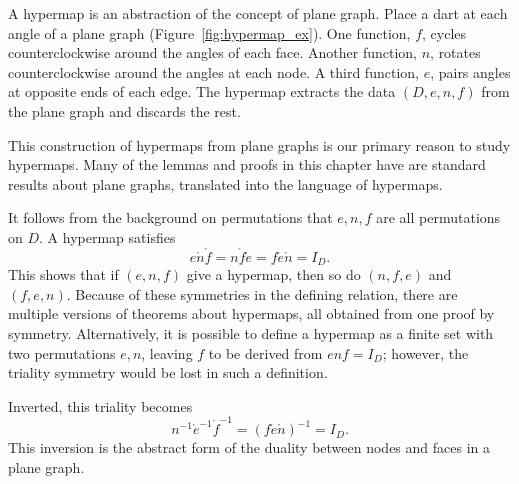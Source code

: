 \begin{remark}\label{rem:hypermap} 
  A hypermap is an abstraction of the concept of plane graph.  Place a
  dart at each angle of a plane graph (Figure~\ref{fig:hypermap_ex}).
  One function, $f$, cycles counterclockwise around the angles of each
  face.  Another function, $n$, rotates counterclockwise around the
  angles at each node.  A third function, $e$, pairs angles at
  opposite ends of each edge.  The hypermap extracts the data
  $(D,e,n,f)$ from the plane graph and discards the rest.

  This construction of hypermaps from plane graphs is our primary
  reason to study hypermaps.  Many of the lemmas and proofs in this
  chapter have are standard results about plane graphs, translated
  into the language of hypermaps.  
%
%
\end{remark}


\figZGPXAWJ %

It follows from the background on permutations that $e,n,f$ are all permutations on $D$.
A hypermap satisfies 
\begin{equation}\label{eqn:triality}
e \ocirc n\ocirc f = n\ocirc f\ocirc e = f\ocirc e\ocirc n = I_D.
\end{equation}
This  shows that if $(e,n,f)$ give a
hypermap, then so do $(n,f,e)$ and $(f,e,n)$.  Because of these
symmetries in the defining relation, there are multiple versions of
theorems about hypermaps, all obtained from one proof by symmetry.
Alternatively, it is possible to define a hypermap as a finite set
with two permutations $e,n$, leaving $f$ to be derived from $e n f =
I_D$; however, the triality symmetry would be lost in such a
definition.

Inverted, this triality becomes
\[ 
n^{-1} \ocirc e^{-1} \ocirc f^{-1} = (f \ocirc e \ocirc n)^{-1} = I_D.
\] 
This inversion is the abstract form of the duality between nodes
and faces in a plane graph. 


